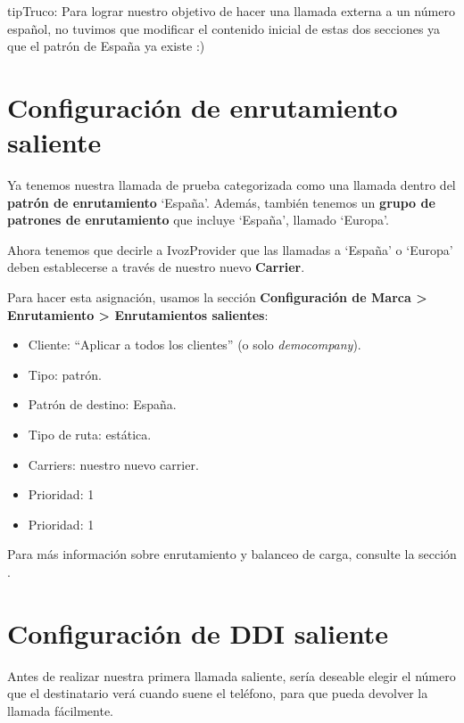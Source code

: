 \documentclass[letterpaper,10pt,spanish]{sphinxmanual}
\begin{document}
\begin{notice}{tip}{Truco:}
Para lograr nuestro objetivo de hacer una llamada externa a un número español, no tuvimos que modificar el contenido inicial de estas dos secciones ya que el patrón de España ya existe :)
\end{notice}


\section{Configuración de enrutamiento saliente}
\label{getting_started/external_outgoing_calls/call_routing:outgoing-routing-configuration}\label{getting_started/external_outgoing_calls/call_routing::doc}
Ya tenemos nuestra llamada de prueba categorizada como una llamada dentro del \textbf{patrón de enrutamiento} `España'. Además, también tenemos un \textbf{grupo de patrones de enrutamiento} que incluye `España', llamado `Europa'.

Ahora tenemos que decirle a IvozProvider que las llamadas a `España' o `Europa' deben establecerse a través de nuestro nuevo \textbf{Carrier}.

Para hacer esta asignación, usamos la sección \textbf{Configuración de Marca \textgreater{} Enrutamiento \textgreater{} Enrutamientos salientes}:
\begin{itemize}
\item {} 
Cliente: ``Aplicar a todos los clientes'' (o solo \emph{democompany}).

\item {} 
Tipo: patrón.

\item {} 
Patrón de destino: España.

\item {} 
Tipo de ruta: estática.

\item {} 
Carriers: nuestro nuevo carrier.

\item {} 
Prioridad: 1

\item {} 
Prioridad: 1

\end{itemize}

Para más información sobre enrutamiento y balanceo de carga, consulte la sección {\hyperref[administration_portal/brand/routing/outgoing_routings:outgoing\string-routings]{}}.


\section{Configuración de DDI saliente}
\label{getting_started/external_outgoing_calls/outgoing_ddi:external-ddi}\label{getting_started/external_outgoing_calls/outgoing_ddi::doc}\label{getting_started/external_outgoing_calls/outgoing_ddi:outgoing-ddi-configuration}
Antes de realizar nuestra primera llamada saliente, sería deseable elegir el número que el destinatario verá cuando suene el teléfono, para que pueda devolver la llamada fácilmente.
\end{document}
